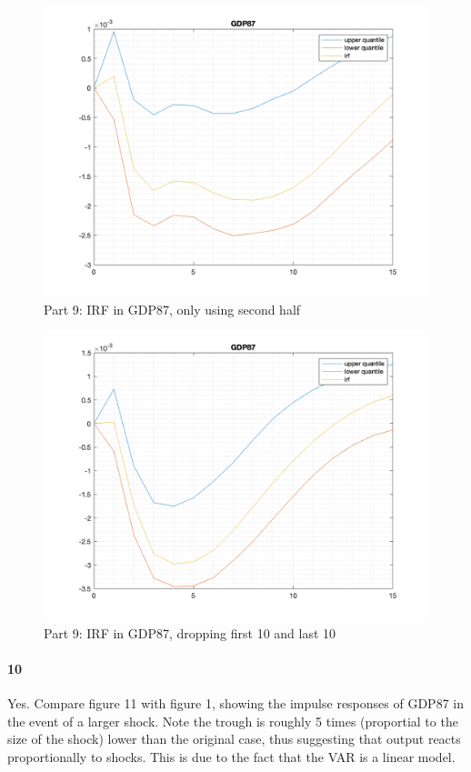 \documentclass[10pt,letter]{article}
\newcommand{\problempart}[1]{\paragraph{#1}}
\begin{document}
\begin{figure}
\begin{center}
\includegraphics[width=15cm]{ps9fig9}
\caption{Part 9: IRF in GDP87, only using second half}
\end{center}
\end{figure}
\begin{figure}
\begin{center}
\includegraphics[width=15cm]{ps9fig10}
\caption{Part 9: IRF in GDP87, dropping first 10 and last 10}
\end{center}
\end{figure}
\problempart{10} Yes. Compare figure 11 with figure 1, showing the impulse responses of GDP87 in the event of a larger shock. Note the trough is roughly 5 times (proportial to the size of the shock) lower than the original case, thus suggesting that output reacts proportionally to shocks. This is due to the fact that the VAR is a linear model.
\end{document}
